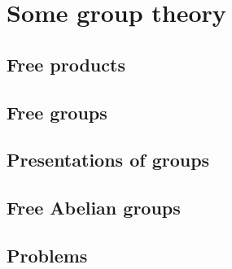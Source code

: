 \chapter{Some group theory}
\section{Free products}
\section{Free groups}
\section{Presentations of groups}
\section{Free Abelian groups}
\section{Problems}

